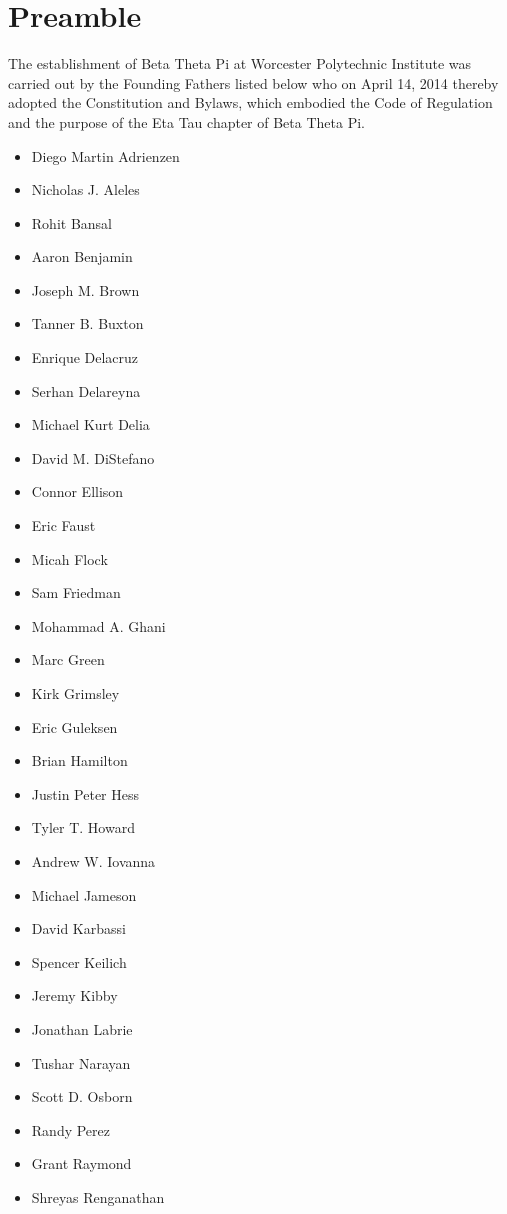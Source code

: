 \section*{Preamble}
The establishment of Beta Theta Pi at Worcester Polytechnic Institute was carried out by the Founding Fathers listed below who on April 14, 2014 thereby adopted the Constitution and Bylaws, which embodied the Code of Regulation and the purpose of the Eta Tau chapter of Beta Theta Pi.

\begin{multicols}{3}
        \begin{itemize}[leftmargin=0pt]
\item[] Diego Martin Adrienzen
\item[] Nicholas J. Aleles
\item[] Rohit Bansal
\item[] Aaron Benjamin
\item[] Joseph M. Brown
\item[] Tanner B. Buxton
\item[] Enrique Delacruz
\item[] Serhan Delareyna
\item[] Michael Kurt Delia
\item[] David M. DiStefano
\item[] Connor Ellison
\item[] Eric Faust
\item[] Micah Flock
\item[] Sam Friedman
\item[] Mohammad A. Ghani
\item[] Marc Green
\item[] Kirk Grimsley
\item[] Eric Guleksen
\item[] Brian Hamilton
\item[] Justin Peter Hess
\item[] Tyler T. Howard
\item[] Andrew W. Iovanna
\item[] Michael Jameson
\item[] David Karbassi
\item[] Spencer Keilich
\item[] Jeremy Kibby
\item[] Jonathan Labrie
\item[] Tushar Narayan
\item[] Scott D. Osborn
\item[] Randy Perez
\item[] Grant Raymond
\item[] Shreyas Renganathan
\end{itemize}

\end{multicols}

